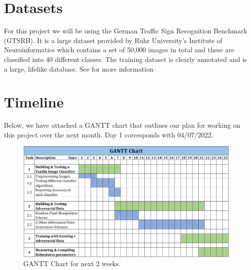 \documentclass{article} %
\begin{document}

\section{Datasets}
For this project we will be using the German Traffic Sign Recognition Benchmark (GTSRB). 
It is a large dataset provided by Ruhr University’s Institute of Neuroinformatics which contains a set of 50,000 images in total and these are classified into 40 different classes. 
The training dataset is clearly annotated and is a large, lifelike database.
See \citet{Stallkamp2012} for more information

\section{Timeline}
Below, we have attached a GANTT chart that outlines our plan for working on this project over the next month. Day 1 corresponds with 04/07/2022. 

\begin{figure}[h]
\begin{center}
\includegraphics[width=13cm]{iclr2022/ProposalGantChart.png}
\end{center}
\caption{GANTT Chart for next 2 weeks.}
\end{figure}




\end{document}
